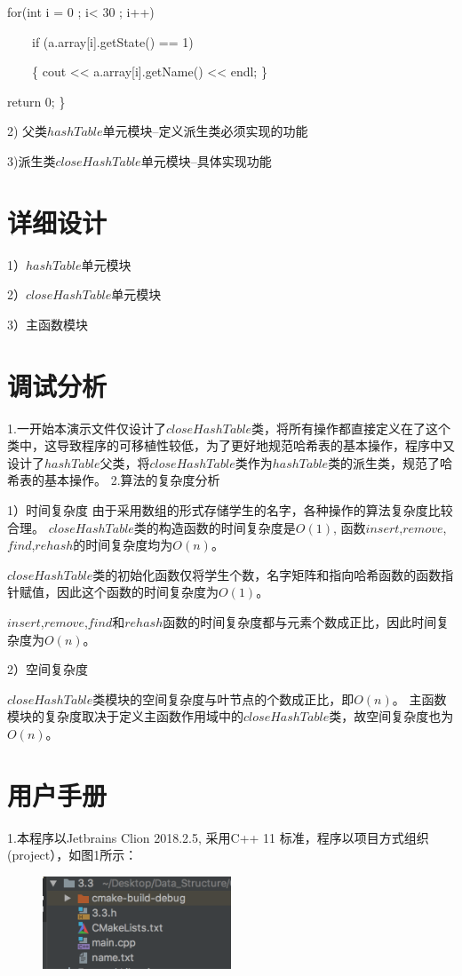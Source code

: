 \documentclass[paper=a4,UTF8,fontsize=11pt]{scrartcl} %
\numberwithin{equation}{section} %
\numberwithin{figure}{section} %
\numberwithin{table}{section} %
\begin{document}
    \qquad \quad for(int i = 0 ; i< 30 ; i++)
    
    \qquad \qquad \ \ \ \ if (a.array[i].getState() == 1) 
        
    \qquad \qquad \ \ \ \ \{ cout << a.array[i].getName() << endl; \}
    
    \qquad \quad    return 0;
\}
       
2)  父类$hashTable$单元模块--定义派生类必须实现的功能

3)派生类$closeHashTable$单元模块--具体实现功能

\section{详细设计}
1）$hashTable$单元模块


2）$closeHashTable$单元模块


3）主函数模块


\vspace{0.3cm}
\section{调试分析}
1.一开始本演示文件仅设计了$closeHashTable$类，将所有操作都直接定义在了这个类中，这导致程序的可移植性较低，为了更好地规范哈希表的基本操作，程序中又设计了$hashTable$父类，将$closeHashTable$类作为$hashTable$类的派生类，规范了哈希表的基本操作。
\newpage
2.算法的复杂度分析

1）时间复杂度
由于采用数组的形式存储学生的名字，各种操作的算法复杂度比较合理。
$closeHashTable$类的构造函数的时间复杂度是$O(1)$, 函数$insert$,$remove$,$find$,$rehash$的时间复杂度均为$O(n)$。

$closeHashTable$类的初始化函数仅将学生个数，名字矩阵和指向哈希函数的函数指针赋值，因此这个函数的时间复杂度为$O(1)$。

$insert$,$remove$,$find$和$rehash$函数的时间复杂度都与元素个数成正比，因此时间复杂度为$O(n)$。

2）空间复杂度

$closeHashTable$类模块的空间复杂度与叶节点的个数成正比，即$O(n)$。
主函数模块的复杂度取决于定义主函数作用域中的$closeHashTable$类，故空间复杂度也为$O(n)$。
\vspace{0.2cm}

\section{用户手册}
1.本程序以Jetbrains Clion 2018.2.5, 采用C++ 11 标准，程序以项目方式组织(project），如图1所示：
\begin{figure}[h]
    \centering
    \includegraphics[width=0.5\textwidth]{33.png}
\end{figure}
\end{document}
